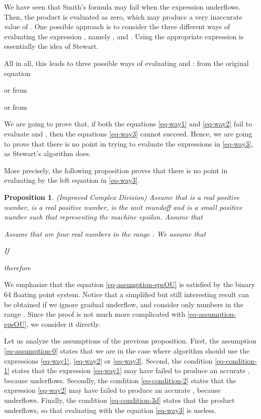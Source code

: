 \documentclass{paper}
\newtheorem{proposition}[theorem]{Proposition}
\begin{document}
We have seen that Smith's formula may fail when 
the expression  underflows. 
Then, the product  is evaluated as zero, which may 
produce a very inaccurate value of .
One possible approach is to consider the three different ways of 
evaluating the expression , namely 
,  and . 
Using the appropriate expression is essentially the idea of 
Stewart. 

All in all, this leads to three possible ways of evaluating  and : from 
the original equation 

or from 

or from


We are going to prove that, if both the equations \ref{eq-way1} 
and \ref{eq-way2} fail to evaluate  and , then 
the equations \ref{eq-way3} cannot succeed. 
Hence, we are going to prove that there is no point in trying 
to evaluate the expressions in \ref{eq-way3}, as 
Stewart's algorithm does.

More precisely, the following proposition proves that there is no point 
in evaluating  by the left equation in \ref{eq-way3}.

\begin{proposition}
(\emph{Improved Complex Division})
\label{prop-impcompdiv}
Assume that  is a real positive number,  is a real positive number, 
 is the unit roundoff and  is a small positive number such 
that  representing the machine epsilon. 
Assume that 

Assume that  are four real numbers in the range . 
We assume that 

If 

therefore

\end{proposition}

We emphasize that the equation \ref{eq-assumption-epsOU} is 
satisfied by the binary 64 floating point system. 
Notice that a simplified but still interesting result can be obtained if 
we ignore gradual underflow, and consider only numbers in the 
range .
Since the proof is not much more complicated 
with \ref{eq-assumption-epsOU}, we consider it directly.

Let us analyze the assumptions of the previous proposition. 
First, the assumption \ref{eq-assumption-0} states that we are in the 
case where algorithm should use the expressions \ref{eq-way1}, 
\ref{eq-way2} or \ref{eq-way3}. 
Second, the condition \ref{eq-condition-1} states that the expression 
\ref{eq-way1} may have failed to produce an accurate 
, because  underflows. 
Secondly, the condition \ref{eq-condition-2} states that the expression 
\ref{eq-way2} may have failed to produce an accurate 
, because  underflows.
Finally, the condition \ref{eq-condition-3d} states that the 
product  underflows, so that evaluating  with the equation 
\ref{eq-way3} is useless. 
\end{document}
